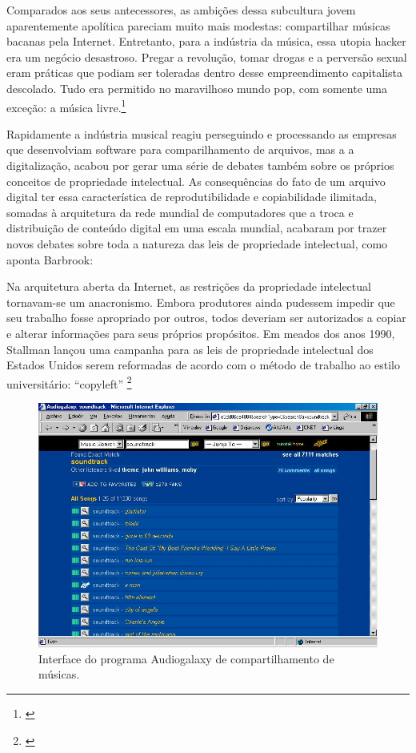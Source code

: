 \begin{citacao}
Comparados aos seus antecessores, as ambições dessa subcultura jovem aparentemente apolítica pareciam muito mais modestas: compartilhar músicas bacanas pela Internet. Entretanto, para a indústria da música, essa utopia hacker era um negócio desastroso. Pregar a revolução, tomar drogas e a perversão sexual eram práticas que podiam ser toleradas dentro desse empreendimento capitalista descolado. Tudo era permitido no maravilhoso mundo pop, com somente uma exceção: a música livre.\footnote{\cite[370]{Barbrook2009}}
\end{citacao}

Rapidamente a indústria musical reagiu perseguindo e processando as empresas que desenvolviam software para comparilhamento de arquivos, mas a a digitalização, acabou por gerar uma série de debates também sobre os próprios conceitos de propriedade intelectual. As consequências do fato de um arquivo digital ter essa característica de reprodutibilidade e copiabilidade ilimitada, somadas à arquitetura da rede mundial de computadores que a troca e distribuição de conteúdo digital em uma escala mundial, acabaram por trazer novos debates sobre toda a natureza das leis de propriedade intelectual, como aponta Barbrook:


\begin{citacao}
Na arquitetura aberta da Internet, as restrições da propriedade intelectual tornavam-se um anacronismo. Embora produtores ainda pudessem impedir que seu trabalho fosse apropriado por outros, todos deveriam ser autorizados a copiar e alterar informações para seus próprios propósitos. Em meados dos anos 1990, Stallman lançou uma campanha para as leis de propriedade intelectual dos Estados Unidos serem reformadas de acordo com o método de trabalho ao estilo universitário: “copyleft” \footnote{\cite[368]{Barbrook2009}} \citeyear{Barbrook2009}
\end{citacao}

\begin{figure}

\includegraphics[width=1\textwidth]{pictures/cap1/audiogalaxy}
\caption{Interface do programa Audiogalaxy de compartilhamento de músicas.}
\label{fig:audiogalaxy}
\end{figure}


